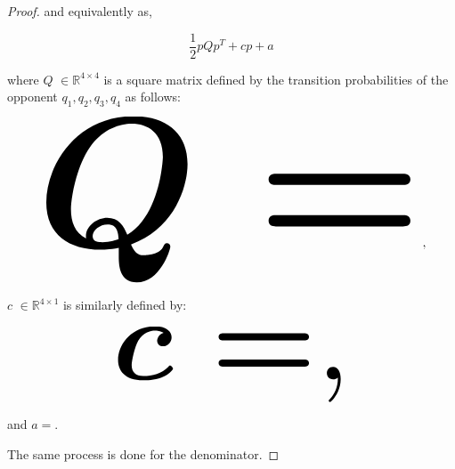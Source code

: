 \documentclass[10pt]{article}
\newcommand{\R}{\mathbb{R}}
\begin{document}
\begin{proof}
    and equivalently as,
    
    \[\frac{1}{2}pQp^T + cp + a\]
    
    where \(Q\) \(\in \R^{4\times4}\) is a square matrix defined by the
    transition probabilities of the opponent \(q_1, q_2, q_3, q_4\) as follows:
    
    \begin{equation*}
        \resizebox{0.9\linewidth}{!}{\arraycolsep=2.5pt%
        \boldmath\(
        Q = \)},
    \end{equation*}
    
    \(c\) \(\in \R^{4 \times 1}\) is similarly defined by:
    
    \begin{equation*}
        \resizebox{0.55\linewidth}{!}{\arraycolsep=2.5pt%
        \boldmath\(c = \),}
    \end{equation*}
    
    and \(a = \).
    
    The same process is done for the denominator.
\end{proof}
\end{document}
